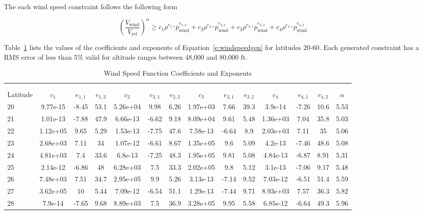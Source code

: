 The each wind speed constraint follows the following form

\begin{equation}
    \label{e:windspeedgen}
    \left(\frac{V_{\text{wind}}}{V_{\text{ref}}}\right)^{\alpha} \geq c_1 \rho^{e_{1,1}}p_{\text{wind}}^{e_{1,2}} + c_2 \rho^{e_{2,1}}p_{\text{wind}}^{e_{2,2}} + c_3 \rho^{e_{3,1}}p_{\text{wind}}^{e_{3,2}} + c_4 \rho^{e_{4,1}}p_{\text{wind}}^{e_{4,2}}
\end{equation}

Table~\ref{t:windvals} lists the values of the coefficients and exponents of Equation~\eqref{e:windspeedgen} for latitudes 20-60. Each generated constraint has a RMS error of less than 5\% valid for altitude ranges between 48,000 and 80,000 ft. 

\tiny
\begin{longtable}{lccccccccccccc} \\
\label{t:windvals} \\
    \caption{Wind Speed Function Coefficients and Exponents} \\
    \toprule
    \toprule
    Latitude & $c_1$ & $e_{1,1}$ & $e_{1,2}$ & $c_2$ & $e_{2,1}$ & $e_{2,2}$ & $c_3$ & $e_{3,1}$ & $e_{3,2}$ & $c_4$ & $e_{4,1}$ & $e_{4,2}$ & $\alpha$ \\
    \midrule
20 & 9.77e-15 & -8.45 & 53.1 & 5.26e+04 & 9.98 & 6.26 & 1.97e+03 & 7.66 & 39.3 & 3.9e-14 & -7.26 & 10.6 & 5.53\\
21 & 1.01e-13 & -7.88 & 47.9 & 6.66e-13 & -6.62 & 9.18 & 8.09e+04 & 9.61 & 5.48 & 1.36e+03 & 7.04 & 35.8 & 5.03\\
22 & 1.12e+05 & 9.65 & 5.29 & 1.53e-13 & -7.75 & 47.6 & 7.58e-13 & -6.64 & 8.9 & 2.03e+03 & 7.11 & 35 & 5.06\\
23 & 2.68e+03 & 7.11 & 34 & 1.07e-12 & -6.61 & 8.67 & 1.35e+05 & 9.6 & 5.09 & 4.2e-13 & -7.46 & 48.6 & 5.08\\
24 & 4.81e+03 & 7.4 & 33.6 & 6.8e-13 & -7.25 & 48.3 & 1.95e+05 & 9.81 & 5.08 & 4.84e-13 & -6.87 & 8.91 & 5.31\\
25 & 2.14e-12 & -6.86 & 48 & 6.28e+03 & 7.5 & 33.3 & 2.02e+05 & 9.8 & 5.12 & 3.1e-13 & -7.06 & 9.17 & 5.48\\
26 & 7.48e+03 & 7.51 & 34.7 & 2.95e+05 & 9.9 & 5.26 & 3.13e-13 & -7.14 & 9.52 & 7.03e-12 & -6.51 & 51.4 & 5.59\\
27 & 3.62e+05 & 10 & 5.44 & 7.09e-12 & -6.54 & 51.1 & 1.29e-13 & -7.44 & 9.71 & 8.93e+03 & 7.57 & 36.3 & 5.82\\
28 & 7.9e-14 & -7.65 & 9.68 & 8.89e+03 & 7.5 & 36.9 & 3.28e+05 & 9.95 & 5.58 & 6.85e-12 & -6.64 & 49.3 & 5.96\\

\end{longtable}
